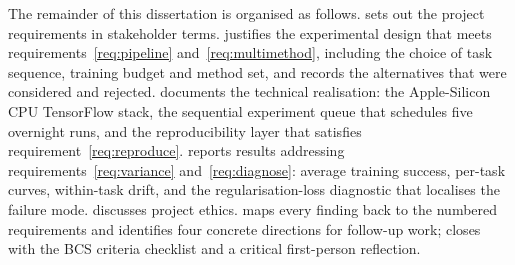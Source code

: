 The remainder of this dissertation is organised as follows.
 sets out the project requirements in stakeholder
terms.  justifies the experimental design that meets
requirements~\ref{req:pipeline} and~\ref{req:multimethod}, including
the choice of task sequence, training budget and method set, and
records the alternatives that were considered and rejected.
 documents the technical realisation: the
Apple-Silicon CPU TensorFlow stack, the sequential experiment queue
that schedules five overnight runs, and the reproducibility layer
that satisfies requirement~\ref{req:reproduce}. 
reports results addressing requirements~\ref{req:variance}
and~\ref{req:diagnose}: average training success, per-task curves,
within-task drift, and the regularisation-loss diagnostic that
localises the failure mode.  discusses project
ethics.  maps every finding back to the numbered
requirements and identifies four concrete directions for follow-up
work;  closes with the BCS criteria checklist and a
critical first-person reflection.
